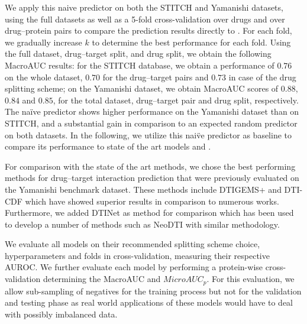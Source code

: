 \documentclass{bioinfo}
\renewcommand{\cite}{\citep}
\begin{document}
We apply this naive predictor on both the STITCH and Yamanishi
datasets, using the full datasets as well as a 5-fold cross-validation
over drugs and over drug--protein pairs to compare the prediction
results directly to \name{}.  For each fold, we gradually increase $k$
to determine the best performance for each fold. Using the full
dataset, drug--target split, and drug split, we obtain the following
MacroAUC results: for the STITCH database, we obtain a performance of
$0.76$ on the whole dataset, $0.70$ for the drug--target pairs and
$0.73$ in case of the drug splitting scheme; on the Yamanishi dataset,
we obtain MacroAUC scores of $0.88$, $0.84$ and $0.85$, for the total
dataset, drug--target pair and drug split, respectively.  The na\"ive
predictor shows higher performance on the Yamanishi dataset than on
STITCH, and a substantial gain in comparison to an expected random
predictor on both datasets. In the following, we utilize this nai\"ve
predictor as baseline to compare its performance to state of the art
models and \name{}.

For comparison with the state of the art methods, we chose the best
performing methods for drug--target interaction prediction that were
previously evaluated on the Yamanishi benchmark dataset. These methods
include DTIGEMS+ \cite{DTIGEMS2020} and DTI-CDF \cite{DTI-CDF2019}
which have showed superior results in comparison to numerous
works. Furthermore, we added DTINet \cite{DTINet2017} as method for
comparison which has been used to develop a number of methods such as
NeoDTI \cite{NeoDTI2019} with similar methodology.

We evaluate all models on their recommended splitting scheme choice,
hyperparameters and folds in cross-validation, measuring their
respective AUROC. We further evaluate each model by performing a
protein-wise cross-validation determining the MacroAUC and
$MicroAUC_p$. For this evaluation, we allow
sub-sampling of negatives for the training process
but not for the validation and testing phase as real world
applications of these models would have to deal with possibly
imbalanced data.
\end{document}
